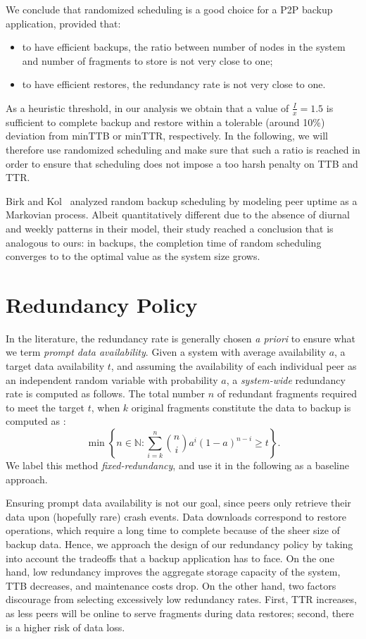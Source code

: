 \documentclass[conference,10pt]{IEEEtran}
\begin{document}
We conclude that randomized scheduling is a good choice for a P2P
backup application, provided that:
\begin{itemize}
\item to have efficient backups, the ratio between number of nodes
      in the system and number of fragments to store is not very close
      to one;
\item to have efficient restores, the redundancy rate is not very close to one.
\end{itemize}

As a heuristic threshold, in our analysis we obtain that a value of
$\frac I x=1.5$ is sufficient to complete backup and restore within a
tolerable (around 10\%) deviation from minTTB or minTTR,
respectively. In the following, we will therefore use randomized
scheduling and make sure that such a ratio is reached in order to
ensure that scheduling does not impose a too harsh penalty on TTB and
TTR.

Birk and Kol~\cite{1339108} analyzed random backup scheduling by
modeling peer uptime as a Markovian process. Albeit quantitatively
different due to the absence of diurnal and weekly patterns in their
model, their study reached a conclusion that is analogous to ours: in
backups, the completion time of random scheduling converges to to the
optimal value as the system size grows.

\section{Redundancy Policy}
\label{sec:red}

In the literature, the redundancy rate is generally chosen \emph{a priori} to ensure what we term \emph{prompt data availability}. Given a system with average availability $a$, a target data availability $t$, and assuming the availability of each individual peer as an independent random variable with probability $a$, a \emph{system-wide} redundancy rate is computed as follows. The total number $n$ of redundant fragments required to meet the target $t$, when $k$ original fragments constitute the data to backup is computed as \cite{bhagwan2003availability}:
\begin{equation}
\min \left\{ n \in \mathbb N :
\sum_{i=k}^n {n \choose i} a^i (1 - a)^{n-i}\geq t
\right\}
.
\label{eq:binomial}
\end{equation}
We label this method \emph{fixed-redundancy}, and use it in the following as a baseline approach.

Ensuring prompt data availability is not our goal, since peers only retrieve their data upon (hopefully rare) crash events. Data downloads correspond to restore operations, which require a long time to complete because of the sheer size of backup data.
Hence, we approach the design of our redundancy policy by taking into account the tradeoffs that a backup application has to face. On the one hand, low redundancy improves the aggregate storage capacity of the system, TTB decreases, and maintenance costs drop. On the other hand, two factors discourage from selecting excessively low redundancy rates. First, TTR increases, as less peers will be online to serve fragments during data restores; second, there is a higher risk of data loss.
\end{document}

